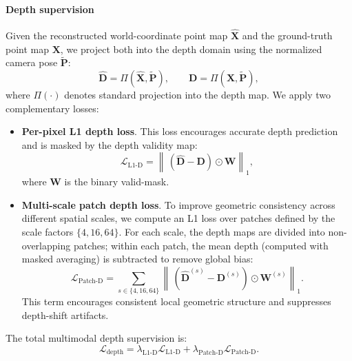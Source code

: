 \paragraph{Depth supervision}
Given the reconstructed world-coordinate point map $\hat{\mathbf{X}}$ and the ground-truth point map $\mathbf{X}$,
we project both into the depth domain using the normalized camera pose $\tilde{\mathbf{P}}$:
\begin{equation}
    \hat{\bm{D}} = \Pi(\hat{\bm{X}}, \tilde{\bm{P}}), \qquad 
    \bm{D} = \Pi(\bm{X}, \tilde{\bm{P}}),
\end{equation}
where $\Pi(\cdot)$ denotes standard projection into the depth map.
We apply two complementary losses:

\begin{itemize}
    \item \textbf{Per-pixel L1 depth loss}.  
    This loss encourages accurate depth prediction and is masked by the depth validity map:
    \begin{equation}
        \mathcal{L}_{\text{L1-D}} = 
        \left\|
        \, (\hat{\mathbf{D}} - \mathbf{D}) \odot \mathbf{W}
        \right\|_{1},
    \end{equation}
    where $\mathbf{W}$ is the binary valid-mask.

    \item \textbf{Multi-scale patch depth loss}.  
    To improve geometric consistency across different spatial scales, we compute an L1 loss over patches defined by the scale factors $\{4,16,64\}$.
    For each scale, the depth maps are divided into non-overlapping patches; within each patch,  
    the mean depth (computed with masked averaging) is subtracted to remove global bias:
    \begin{equation}
        \mathcal{L}_{\text{Patch-D}} 
        = 
        \sum_{s \in \{4,16,64\}}
        \left\|
        \, \left( \hat{\mathbf{D}}^{(s)} - \mathbf{D}^{(s)} \right)
        \odot \mathbf{W}^{(s)}
        \right\|_{1}.
    \end{equation}
    This term encourages consistent local geometric structure and suppresses depth-shift artifacts.
\end{itemize}

The total multimodal depth supervision is:
\begin{equation}
    \mathcal{L}_{\text{depth}} 
    = 
    \lambda_{\text{L1-D}} \mathcal{L}_{\text{L1-D}}
    +
    \lambda_{\text{Patch-D}} \mathcal{L}_{\text{Patch-D}}.
\end{equation}  

